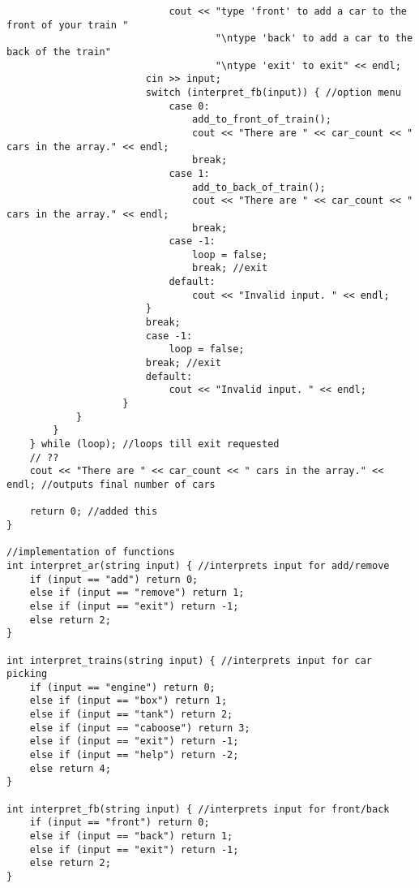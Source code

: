 \documentclass[11pt]{article}
\begin{document}
\begin{lstlisting}
                            cout << "type 'front' to add a car to the front of your train "
                                    "\ntype 'back' to add a car to the back of the train"
                                    "\ntype 'exit' to exit" << endl;
                        cin >> input;
                        switch (interpret_fb(input)) { //option menu
                            case 0:
                                add_to_front_of_train();
                                cout << "There are " << car_count << " cars in the array." << endl;
                                break;
                            case 1:
                                add_to_back_of_train();
                                cout << "There are " << car_count << " cars in the array." << endl;
                                break;
                            case -1:
                                loop = false;
                                break; //exit
                            default:
                                cout << "Invalid input. " << endl;
                        }
                        break;
                        case -1:
                            loop = false;
                        break; //exit
                        default:
                            cout << "Invalid input. " << endl;
                    }
            }
        }
    } while (loop); //loops till exit requested
    // ??
    cout << "There are " << car_count << " cars in the array." << endl; //outputs final number of cars

    return 0; //added this
}

//implementation of functions
int interpret_ar(string input) { //interprets input for add/remove
    if (input == "add") return 0;
    else if (input == "remove") return 1;
    else if (input == "exit") return -1;
    else return 2;
}

int interpret_trains(string input) { //interprets input for car picking
    if (input == "engine") return 0;
    else if (input == "box") return 1;
    else if (input == "tank") return 2;
    else if (input == "caboose") return 3;
    else if (input == "exit") return -1;
    else if (input == "help") return -2;
    else return 4;
}

int interpret_fb(string input) { //interprets input for front/back
    if (input == "front") return 0;
    else if (input == "back") return 1;
    else if (input == "exit") return -1;
    else return 2;
}


\end{lstlisting}
\end{document}
